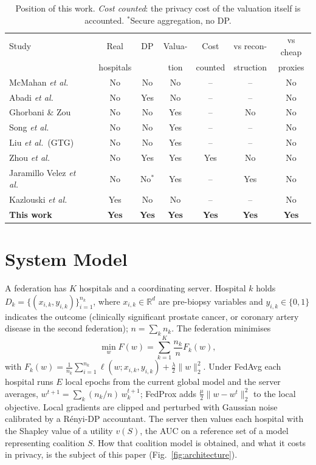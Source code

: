 \documentclass[journal]{IEEEtran}
\begin{document}
\begin{table}[t]
\caption{Position of this work. \emph{Cost counted}: the privacy cost of the valuation itself is accounted. $^{\ast}$Secure aggregation, no DP.}
\centering\scriptsize
\setlength{\tabcolsep}{3pt}
\begin{tabular}{lcccccc}
\toprule
Study & Real & DP & Valua- & Cost & vs recon- & vs cheap \\
 & hospitals & & tion & counted & struction & proxies \\
\midrule
McMahan \emph{et al.}\ \cite{McMahan2017FedAvg} & No & No & No & -- & -- & No \\
Abadi \emph{et al.}\ \cite{Abadi2016DPSGD} & No & Yes & No & -- & -- & No \\
Ghorbani \& Zou \cite{Ghorbani2019DataShapley} & No & No & Yes & -- & No & No \\
Song \emph{et al.}\ \cite{Song2019BlockchainFL} & No & No & Yes & -- & -- & No \\
Liu \emph{et al.}\ (GTG) \cite{Liu2022GTG} & No & No & Yes & -- & -- & No \\
Zhou \emph{et al.}\ \cite{Zhou2025Data} & No & Yes & Yes & Yes & No & No \\
Jaramillo Velez \emph{et al.}\ \cite{JaramilloVelez2026Beyond} & No & No$^{\ast}$ & Yes & -- & Yes & No \\
Kazlouski \emph{et al.}\ \cite{Kazlouski2025HospitalParticipation} & Yes & No & No & -- & -- & No \\
\textbf{This work} & \textbf{Yes} & \textbf{Yes} & \textbf{Yes} & \textbf{Yes} & \textbf{Yes} & \textbf{Yes} \\
\bottomrule
\end{tabular}
\label{tab:lit_comparison}
\end{table}

\section{System Model}
\label{sec:system}
A federation has $K$ hospitals and a coordinating server. Hospital $k$ holds $D_k = \{(x_{i,k}, y_{i,k})\}_{i=1}^{n_k}$, where $x_{i,k} \in \mathbb{R}^d$ are pre-biopsy variables and $y_{i,k} \in \{0, 1\}$ indicates the outcome (clinically significant prostate cancer, or coronary artery disease in the second federation); $n = \sum_k n_k$. The federation minimises
\begin{equation}
\min_w F(w) = \sum_{k=1}^K \frac{n_k}{n} F_k(w),
\end{equation}
with $F_k(w) = \frac{1}{n_k} \sum_{i=1}^{n_k} \ell(w; x_{i,k}, y_{i,k}) + \frac{\lambda}{2}\|w\|_2^2$.
Under FedAvg each hospital runs $E$ local epochs from the current global model and the server averages, $w^{t+1} = \sum_k (n_k/n)\, w_k^{t+1}$; FedProx adds $\frac{\mu}{2}\|w - w^t\|_2^2$ to the local objective. Local gradients are clipped and perturbed with Gaussian noise calibrated by a R\'enyi-DP accountant. The server then values each hospital with the Shapley value of a utility $v(S)$, the AUC on a reference set of a model representing coalition $S$. How that coalition model is obtained, and what it costs in privacy, is the subject of this paper (Fig.~\ref{fig:architecture}).
\end{document}
